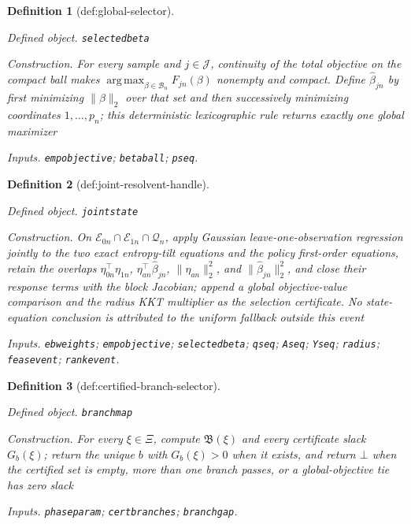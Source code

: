\documentclass{article}
\newtheorem{definition}{Definition}
\begin{document}
\begin{definition}[def:global-selector]\label{def:global-selector}
\par\smallskip\noindent\emph{Defined object.} \texttt{selectedbeta}
\par\smallskip\noindent\emph{Construction.} For every sample and \(j\in\mathcal J\), continuity of the total objective on the compact ball makes \(\operatorname*{arg\,max}_{\beta\in\mathcal B_n}F_{jn}(\beta)\) nonempty and compact. Define \(\widehat\beta_{jn}\) by first minimizing \(\|\beta\|_2\) over that set and then successively minimizing coordinates \(1,\ldots,p_n\); this deterministic lexicographic rule returns exactly one global maximizer
\par\smallskip\noindent\emph{Inputs.} \texttt{empobjective}; \texttt{betaball}; \texttt{pseq}.
\end{definition}

\begin{definition}[def:joint-resolvent-handle]\label{def:joint-resolvent-handle}
\par\smallskip\noindent\emph{Defined object.} \texttt{jointstate}
\par\smallskip\noindent\emph{Construction.} On \(\mathcal E_{0n}\cap\mathcal E_{1n}\cap\mathcal Q_n\), apply Gaussian leave-one-observation regression jointly to the two exact entropy-tilt equations and the policy first-order equations, retain the overlaps \(\eta_{0n}^{\top}\eta_{1n}\), \(\eta_{an}^{\top}\widehat\beta_{jn}\), \(\|\eta_{an}\|_2^2\), and \(\|\widehat\beta_{jn}\|_2^2\), and close their response terms with the block Jacobian; append a global objective-value comparison and the radius KKT multiplier as the selection certificate. No state-equation conclusion is attributed to the uniform fallback outside this event
\par\smallskip\noindent\emph{Inputs.} \texttt{ebweights}; \texttt{empobjective}; \texttt{selectedbeta}; \texttt{qseq}; \texttt{Aseq}; \texttt{Yseq}; \texttt{radius}; \texttt{feasevent}; \texttt{rankevent}.
\end{definition}

\begin{definition}[def:certified-branch-selector]\label{def:certified-branch-selector}
\par\smallskip\noindent\emph{Defined object.} \texttt{branchmap}
\par\smallskip\noindent\emph{Construction.} For every \(\xi\in\Xi\), compute \(\mathfrak B(\xi)\) and every certificate slack \(G_b(\xi)\); return the unique \(b\) with \(G_b(\xi)>0\) when it exists, and return \(\bot\) when the certified set is empty, more than one branch passes, or a global-objective tie has zero slack
\par\smallskip\noindent\emph{Inputs.} \texttt{phaseparam}; \texttt{certbranches}; \texttt{branchgap}.
\end{definition}
\end{document}
